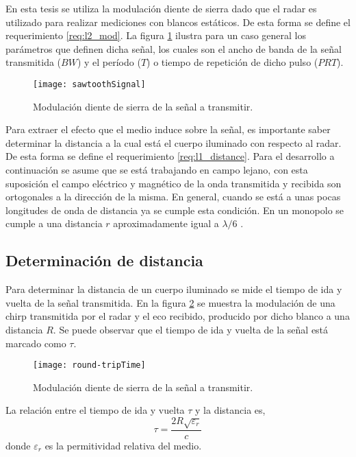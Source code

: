 En esta tesis se utiliza la modulación diente de sierra dado que el radar es utilizado para realizar mediciones con blancos estáticos. De esta forma se define el requerimiento \ref{req:l2_mod}. La figura \ref{fig:sawtoothSignal} ilustra para un caso general los parámetros que definen dicha señal, los cuales son el ancho de banda de la señal transmitida ($BW$) y el período ($T$) o tiempo de repetición de dicho pulso ($PRT$).

\begin{figure}
 \centering
 \texttt{[image: sawtoothSignal]}
 \caption{Modulación diente de sierra de la señal a transmitir.}
 \label{fig:sawtoothSignal}
\end{figure}

Para extraer el efecto que el medio induce sobre la señal, es importante saber determinar la distancia a la cual está el cuerpo iluminado con respecto al radar. De esta forma se define el requerimiento \ref{req:l1_distance}. Para el desarrollo a continuación se asume que se está trabajando en campo lejano, con esta suposición el campo eléctrico y magnético de la onda transmitida y recibida son ortogonales a la dirección de la misma. En general, cuando se está a unas pocas longitudes de onda de distancia ya se cumple esta condición. En un monopolo se cumple a una distancia $r$ aproximadamente igual a $\lambda/ 6$ \cite{Richards2009}.


\subsection{Determinación de distancia}

Para determinar la distancia de un cuerpo iluminado se mide el tiempo de ida y vuelta de la señal transmitida. En la figura \ref{fig:roundTripTime} se muestra la modulación de una chirp transmitida por el radar y el eco recibido, producido por dicho blanco a una distancia $R$. Se puede observar que el tiempo de ida y vuelta de la señal está marcado como $\tau$.

\begin{figure}
 \centering
 \texttt{[image: round-tripTime]}
 \caption{Modulación diente de sierra de la señal a transmitir.}
 \label{fig:roundTripTime}
\end{figure}

La relación entre el tiempo de ida y vuelta $\tau$ y la distancia es,
\begin{equation}\label{eq:relDist}
  \tau = \dfrac{2R\sqrt{\varepsilon_r}}{c}
\end{equation}
donde $\varepsilon_r$ es la permitividad relativa del medio.

